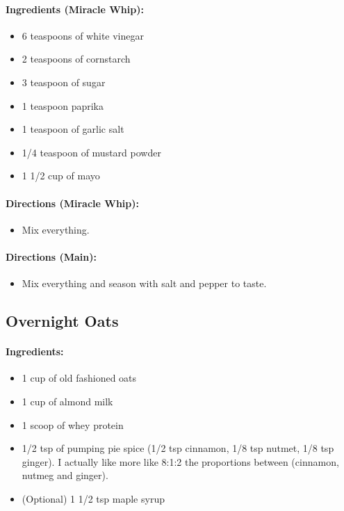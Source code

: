 \documentclass{article}
\begin{document}
\paragraph{Ingredients (Miracle Whip):}
\begin{itemize}
	\item 6 teaspoons of white vinegar 
	\item 2 teaspoons of cornstarch 
	\item 3 teaspoon of sugar 
	\item 1 teaspoon paprika 
	\item 1 teaspoon of garlic salt 
	\item 1/4 teaspoon of mustard powder 
	\item 1 1/2 cup of mayo
\end{itemize}

\paragraph{Directions (Miracle Whip):}
\begin{itemize}
	\item Mix everything.
\end{itemize}

\paragraph{Directions (Main):}
\begin{itemize}
	\item Mix everything and season with salt and pepper to taste.
\end{itemize}

\subsection{Overnight Oats}

\paragraph{Ingredients:}

\begin{itemize}
	\item 1 cup of old fashioned oats
	\item 1 cup of almond milk
	\item 1 scoop of whey protein
	\item 1/2 tsp of pumping pie spice (1/2 tsp cinnamon, 1/8 tsp nutmet, 1/8 tsp ginger). I actually like more like 8:1:2 the proportions between (cinnamon, nutmeg and ginger).
	\item (Optional) 1 1/2 tsp maple syrup
\end{itemize}
\end{document}
